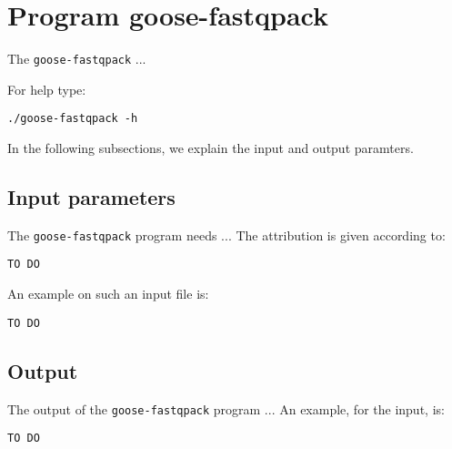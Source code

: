 \section{Program goose-fastqpack}
The \texttt{goose-fastqpack} ...

For help type:
\begin{lstlisting}
./goose-fastqpack -h
\end{lstlisting}
In the following subsections, we explain the input and output paramters.

\subsection{Input parameters}

The \texttt{goose-fastqpack} program needs ...
The attribution is given according to:
\begin{lstlisting}
TO DO
\end{lstlisting}

An example on such an input file is:
\begin{lstlisting}
TO DO
\end{lstlisting}

\subsection{Output}
The output of the \texttt{goose-fastqpack} program ...
An example, for the input, is:
\begin{lstlisting}
TO DO
\end{lstlisting}
